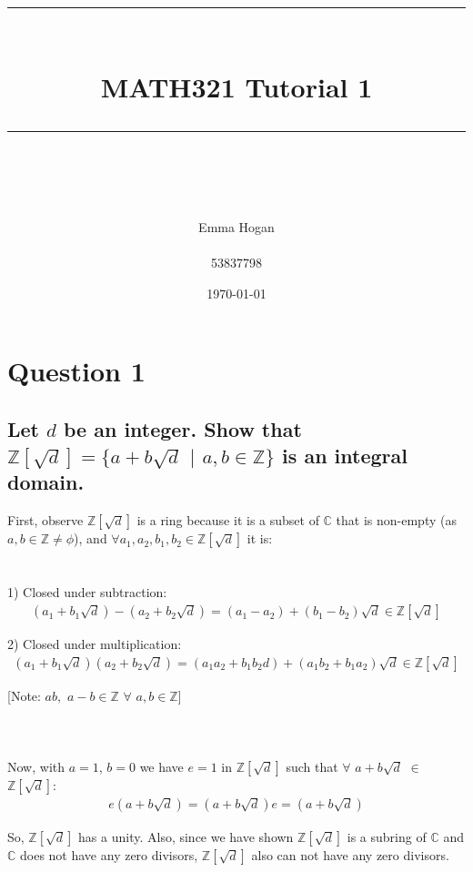 \documentclass{article}
\title{	
	\normalfont\normalsize
	\vspace{25pt} %
	\rule{\linewidth}{0.5pt}\\ %
	\vspace{20pt} %
	{\huge MATH321 Tutorial 1}\\ %
	\vspace{12pt} %
	\rule{\linewidth}{2pt}\\ %
	\vspace{12pt} %
}
\author{\LARGE Emma Hogan \\\\53837798} %
\date{\normalsize\today} %
\begin{document}
\begin{titlepage}
\maketitle
\thispagestyle{empty}
\end{titlepage}
\section*{Question 1}
\subsection*{Let \(d\) be an integer. Show that \(\mathds{Z}[\sqrt{d}] = \{a + b\sqrt{d}\) \(|\) \(a,b \in \mathds{Z}\}\) is an integral domain.}

\solution
First, observe \(\mathds{Z}[\sqrt{d}]\) is a ring because it is a subset of \(\mathds{C}\) that is non-empty (as \(a, b \in \mathds{Z} \neq \phi\)), and \(\forall a_1, a_2, b_1, b_2 \in \mathds{Z}[\sqrt{d}]\) it is:
\\\\\\
	\hspace*{8mm} 1) Closed under subtraction:
\begin{align*}
  (a_1 + b_1\sqrt{d}) - (a_2 + b_2\sqrt{d}) = (a_1 - a_2) + (b_1 - b_2)\sqrt{d} \in \mathds{Z}[\sqrt{d}]
\end{align*}	

	\hspace*{8mm} 2) Closed under multiplication:
\begin{align*}
	(a_1 + b_1\sqrt{d})(a_2 + b_2\sqrt{d}) = (a_1 a_2 + b_1 b_2 d) + (a_1 b_2 + b_1 a_2)\sqrt{d} \in \mathds{Z}[\sqrt{d}]
\end{align*}


[Note: \(ab,\) \(a-b \in \mathds{Z}\) \(\forall\) \(a, b \in \mathds{Z}\)]
\\\\\\\\
Now, with \(a=1\), \(b=0\) we have \(e = 1\) in \(\mathds{Z}[\sqrt{d}]\) such that \(\forall\) \(a+b\sqrt{d}\) \(\in\) \(\mathds{Z}[\sqrt{d}]\):
\begin{align*}
	e(a+b\sqrt{d}) = (a+b\sqrt{d})e = (a+b\sqrt{d})
\end{align*}

So, \(\mathds{Z}[\sqrt{d}]\) has a unity. Also, since we have shown \(\mathds{Z}[\sqrt{d}]\) is a subring of \(\mathds{C}\) and \(\mathds{C}\) does not have any zero divisors, \(\mathds{Z}[\sqrt{d}]\) also can not have any zero divisors.
\end{document}
